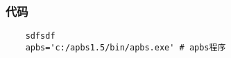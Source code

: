 \begin{frame}[fragile]
\frametitle{代码}
\begin{lstlisting}
    sdfsdf
    apbs='c:/apbs1.5/bin/apbs.exe' # apbs程序
\end{lstlisting}
\end{frame}

